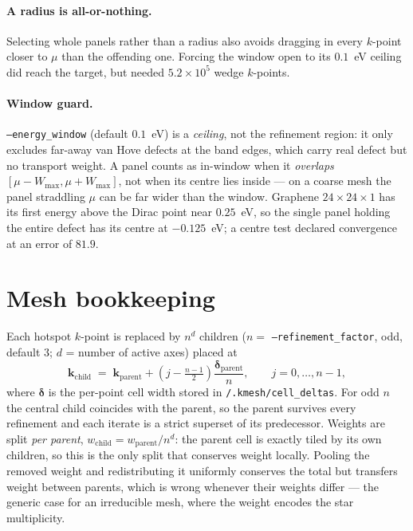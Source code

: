 \documentclass[11pt,a4paper]{article}
\newcommand{\kk}{\mathbf{k}}
\newcommand{\code}[1]{\texttt{#1}}
\begin{document}
\paragraph{A radius is all-or-nothing.}
Selecting whole panels rather than a radius also avoids dragging in every
$k$-point closer to $\mu$ than the offending one. Forcing the window open to
its $0.1$~eV ceiling did reach the target, but needed $5.2\times10^{5}$ wedge
$k$-points.

\paragraph{Window guard.}
\code{--energy\_window} (default $0.1$~eV) is a \emph{ceiling}, not the
refinement region: it only excludes far-away van Hove defects at the band
edges, which carry real defect but no transport weight. A panel counts as
in-window when it \emph{overlaps} $[\mu-W_{\max},\mu+W_{\max}]$, not when its
centre lies inside --- on a coarse mesh the panel straddling $\mu$ can be far
wider than the window. Graphene $24\times24\times1$ has its first energy above
the Dirac point near $0.25$~eV, so the single panel holding the entire defect
has its centre at $-0.125$~eV; a centre test declared convergence at an error
of $81.9$.

\section{Mesh bookkeeping}

Each hotspot $k$-point is replaced by $n^{d}$ children ($n=$
\code{--refinement\_factor}, odd, default 3; $d$ = number of active axes)
placed at
\begin{equation}
  \kk_\text{child} \;=\; \kk_\text{parent}
    + \left(j-\tfrac{n-1}{2}\right)\frac{\boldsymbol{\delta}_\text{parent}}{n},
  \qquad j=0,\dots,n-1 ,
\end{equation}
where $\boldsymbol{\delta}$ is the per-point cell width stored in
\code{/.kmesh/cell\_deltas}. For odd $n$ the central child coincides with the
parent, so the parent survives every refinement and each iterate is a strict
superset of its predecessor. Weights are split \emph{per parent},
$w_\text{child}=w_\text{parent}/n^{d}$: the parent cell is exactly tiled by
its own children, so this is the only split that conserves weight locally.
Pooling the removed weight and redistributing it uniformly conserves the total
but transfers weight between parents, which is wrong whenever their weights
differ --- the generic case for an irreducible mesh, where the weight encodes
the star multiplicity.
\end{document}
